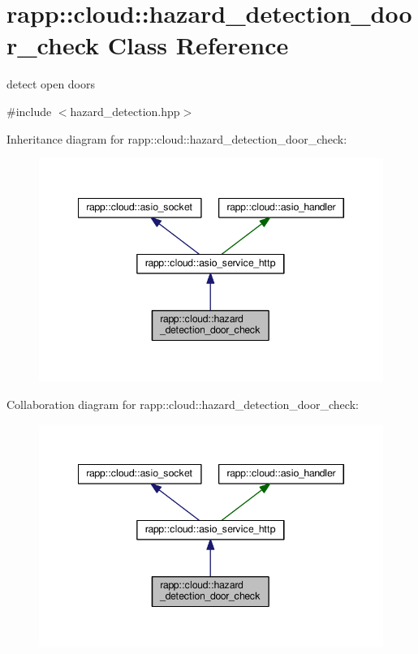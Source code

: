 \hypertarget{classrapp_1_1cloud_1_1hazard__detection__door__check}{\section{rapp\-:\-:cloud\-:\-:hazard\-\_\-detection\-\_\-door\-\_\-check Class Reference}
\label{classrapp_1_1cloud_1_1hazard__detection__door__check}
}


detect open doors  




{\ttfamily \#include $<$hazard\-\_\-detection.\-hpp$>$}



Inheritance diagram for rapp\-:\-:cloud\-:\-:hazard\-\_\-detection\-\_\-door\-\_\-check\-:
\nopagebreak
\begin{figure}[H]
\begin{center}
\leavevmode
\includegraphics[width=345pt]{classrapp_1_1cloud_1_1hazard__detection__door__check__inherit__graph}
\end{center}
\end{figure}


Collaboration diagram for rapp\-:\-:cloud\-:\-:hazard\-\_\-detection\-\_\-door\-\_\-check\-:
\nopagebreak
\begin{figure}[H]
\begin{center}
\leavevmode
\includegraphics[width=345pt]{classrapp_1_1cloud_1_1hazard__detection__door__check__coll__graph}
\end{center}
\end{figure}
